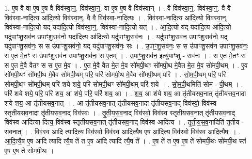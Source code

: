 \documentclass[17pt]{extarticle}
\begin{document}
1. ए॒ष वै वा ए॒ष ए॒ष वै विव॑स्वा॒न्॒. विव॑स्वा॒न्॒. वा ए॒ष ए॒ष वै विव॑स्वान् । . वै विव॑स्वा॒न्॒. विव॑स्वा॒न्॒. वै वै विव॑स्वा-नादि॒त्य आ॑दि॒त्यो विव॑स्वा॒न्॒. वै वै विव॑स्वा-नादि॒त्यः । . विव॑स्वा-नादि॒त्य आ॑दि॒त्यो विव॑स्वा॒न्॒. विव॑स्वा-नादि॒त्यो यद् यदा॑दि॒त्यो विव॑स्वा॒न्॒. विव॑स्वा-नादि॒त्यो यत् । . आ॒दि॒त्यो यद् यदा॑दि॒त्य आ॑दि॒त्यो यदु॑पाꣳशु॒सव॑न उपाꣳशु॒सव॑नो॒ यदा॑दि॒त्य आ॑दि॒त्यो यदु॑पाꣳशु॒सव॑नः । . यदु॑पाꣳशु॒सव॑न उपाꣳशु॒सव॑नो॒ यद् यदु॑पाꣳशु॒सव॑नः॒ स स उ॑पाꣳशु॒सव॑नो॒ यद् यदु॑पाꣳशु॒सव॑नः॒ सः । . उ॒पाꣳ॒॒शु॒सव॑नः॒ स स उ॑पाꣳशु॒सव॑न उपाꣳशु॒सव॑नः॒ स ए॒त मे॒तꣳ स उ॑पाꣳशु॒सव॑न उपाꣳशु॒सव॑नः॒ स ए॒तम् । . उ॒पाꣳ॒॒शु॒सव॑न॒ इत्यु॑पाꣳशु - सव॑नः । . स ए॒त मे॒तꣳ स स ए॒त मे॒वै वैतꣳ स स ए॒त मे॒व । . ए॒त मे॒वै वैत मे॒त मे॒व सो॑मपी॒थꣳ सो॑मपी॒थ मे॒वैत मे॒त मे॒व सो॑मपी॒थम् । . ए॒व सो॑मपी॒थꣳ सो॑मपी॒थ मे॒वैव सो॑मपी॒थम् परि॒ परि॑ सोमपी॒थ मे॒वैव सो॑मपी॒थम् परि॑ । . सो॒म॒पी॒थम् परि॒ परि॑ सोमपी॒थꣳ सो॑मपी॒थम् परि॑ शये शये॒ परि॑ सोमपी॒थꣳ सो॑मपी॒थम् परि॑ शये । . सो॒म॒पी॒थमिति॑ सोम - पी॒थम् । . परि॑ शये शये॒ परि॒ परि॑ शय॒ आ श॑ये॒ परि॒ परि॑ शय॒ आ । . श॒य॒ आ श॑ये शय॒ आ तृ॑तीयसव॒नात् तृ॑तीयसव॒नादा श॑ये शय॒ आ तृ॑तीयसव॒नात् । . आ तृ॑तीयसव॒नात् तृ॑तीयसव॒नादा तृ॑तीयसव॒नाद् विव॑स्वो॒ विव॑स्व स्तृतीयसव॒नादा तृ॑तीयसव॒नाद् विव॑स्वः । . तृ॒ती॒य॒स॒व॒नाद् विव॑स्वो॒ विव॑स्व स्तृतीयसव॒नात् तृ॑तीयसव॒नाद् विव॑स्व आदित्या दित्य॒ विव॑स्व स्तृतीयसव॒नात् तृ॑तीयसव॒नाद् विव॑स्व आदित्य । . तृ॒ती॒य॒स॒व॒नादिति॑ तृतीय - स॒व॒नात् । . विव॑स्व आदि त्यादित्य॒ विव॑स्वो॒ विव॑स्व आदित्यै॒ष ए॒ष आ॑दित्य॒ विव॑स्वो॒ विव॑स्व आदित्यै॒षः । . आ॒दि॒त्यै॒ष ए॒ष आ॑दि त्यादि त्यै॒ष ते॑ त ए॒ष आ॑दि त्यादि त्यै॒ष ते᳚ । . ए॒ष ते॑ त ए॒ष ए॒ष ते॑ सोमपी॒थः सो॑मपी॒थ स्त॑ ए॒ष ए॒ष ते॑ सोमपी॒थः । \newline
\end{document}

